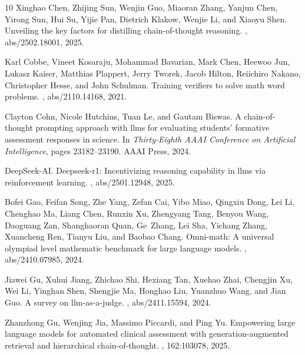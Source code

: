 \documentclass{article}
\begin{document}
{\begin{thebibliography}{10}
        Xinghao Chen, Zhijing Sun, Wenjin Guo, Miaoran Zhang, Yanjun Chen, Yirong Sun, Hui Su, Yijie Pan, Dietrich Klakow, Wenjie Li, and Xiaoyu Shen.
        \newblock Unveiling the key factors for distilling chain-of-thought reasoning.
        , abs/2502.18001, 2025.
        
        Karl Cobbe, Vineet Kosaraju, Mohammad Bavarian, Mark Chen, Heewoo Jun, Lukasz Kaiser, Matthias Plappert, Jerry Tworek, Jacob Hilton, Reiichiro Nakano, Christopher Hesse, and John Schulman.
        \newblock Training verifiers to solve math word problems.
        , abs/2110.14168, 2021.
        
        Clayton Cohn, Nicole Hutchins, Tuan Le, and Gautam Biswas.
        \newblock A chain-of-thought prompting approach with llms for evaluating students' formative assessment responses in science.
        \newblock In {\em Thirty-Eighth {AAAI} Conference on Artificial Intelligence}, pages 23182--23190. {AAAI} Press, 2024.
        
        DeepSeek{-}AI.
        \newblock Deepseek-r1: Incentivizing reasoning capability in llms via reinforcement learning.
        , abs/2501.12948, 2025.
        
        Bofei Gao, Feifan Song, Zhe Yang, Zefan Cai, Yibo Miao, Qingxiu Dong, Lei Li, Chenghao Ma, Liang Chen, Runxin Xu, Zhengyang Tang, Benyou Wang, Daoguang Zan, Shanghaoran Quan, Ge~Zhang, Lei Sha, Yichang Zhang, Xuancheng Ren, Tianyu Liu, and Baobao Chang.
        \newblock Omni-math: {A} universal olympiad level mathematic benchmark for large language models.
        , abs/2410.07985, 2024.
        
        Jiawei Gu, Xuhui Jiang, Zhichao Shi, Hexiang Tan, Xuehao Zhai, Chengjin Xu, Wei Li, Yinghan Shen, Shengjie Ma, Honghao Liu, Yuanzhuo Wang, and Jian Guo.
        \newblock A survey on llm-as-a-judge.
        , abs/2411.15594, 2024.
        
        Zhanzhong Gu, Wenjing Jia, Massimo Piccardi, and Ping Yu.
        \newblock Empowering large language models for automated clinical assessment with generation-augmented retrieval and hierarchical chain-of-thought.
        , 162:103078, 2025.
        

\end{thebibliography}}
\end{document}

